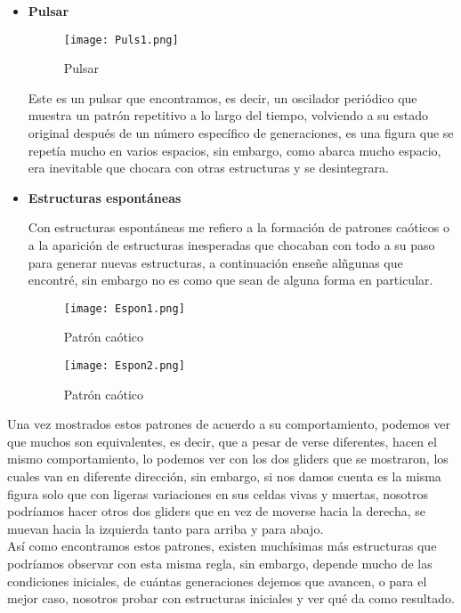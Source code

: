\documentclass{article}
\begin{document}
\begin{itemize}
	\item \textbf{Pulsar}
	
		\begin{figure}[htbp]
		\centering       
		\texttt{[image: Puls1.png]}
		\caption{Pulsar}
		\label{fig:muer7} 
		\end{figure}
	
	Este es un pulsar que encontramos, es decir, un oscilador periódico que muestra un patrón repetitivo a lo largo del tiempo, volviendo a su estado original después de un número específico de generaciones, es una figura que se repetía mucho en varios espacios, sin embargo, como abarca mucho espacio, era inevitable que chocara con otras estructuras y se desintegrara. 
	
	\item \textbf{Estructuras espontáneas}		
	
	Con estructuras espontáneas me refiero a la formación de patrones caóticos o a la aparición de estructuras inesperadas que chocaban con todo a su paso para generar nuevas estructuras, a continuación enseñe alñgunas que encontré, sin embargo no es como que sean de alguna forma en particular. 
	
	\begin{figure}[htbp]
		\centering       
		\texttt{[image: Espon1.png]}
		\caption{Patrón caótico}
		\label{fig:Es1} 
	\end{figure}
	
	\begin{figure}[htbp]
		\centering       
		\texttt{[image: Espon2.png]}
		\caption{Patrón caótico}
		\label{fig:Es2} 
	\end{figure}
	
	\end{itemize}
	
 Una vez mostrados estos patrones de acuerdo a su comportamiento, podemos ver que muchos son equivalentes, es decir, que a pesar de verse diferentes, hacen el mismo comportamiento, lo podemos ver con los dos gliders que se mostraron, los cuales van en diferente dirección, sin embargo, si nos damos cuenta es la misma figura solo que con ligeras variaciones en sus celdas vivas y muertas, nosotros podríamos hacer otros dos gliders que en vez de moverse hacia la derecha, se muevan hacia la izquierda tanto para arriba y para abajo. 
 \\
 Así como encontramos estos patrones, existen muchísimas más estructuras que podríamos observar con esta misma regla, sin embargo, depende mucho de las condiciones iniciales, de cuántas generaciones dejemos que avancen, o para el mejor caso, nosotros probar con estructuras iniciales y ver qué da como resultado. 
 
\end{document}
